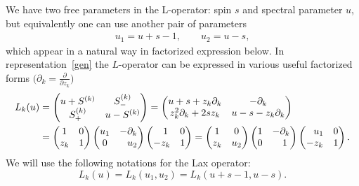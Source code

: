 \documentclass[pdftex]{sigma}
\numberwithin{equation}{section}
\begin{document}
We have two free parameters in the L-operator:
spin $s$ and spectral parameter $u$, but equivalently
one can use another pair of parameters
\begin{align*}
u_1 = u+s-1,\qquad u_2 = u - s,
\end{align*}
which appear in a natural way in factorized expression below.
In representation~\eqref{gen} the $L$-operator can be
expressed in various useful factorized forms
$\bigl(\partial_k = \frac{\partial}{\partial z_k}\bigr)$
\begin{align}
\nonumber
L_k(u) & =
\begin{pmatrix}
u + S^{(k)} & S_{-}^{(k)} \\
S_{+}^{(k)} & u - S^{(k)} \end{pmatrix} =
\begin{pmatrix} u+s+z_k \partial_k & -\partial_k\\
z_k^2 \partial_k + 2s z_k & u-s-z_k
\partial_k
\end{pmatrix}
\\
\label{Lfac}
&=
\begin{pmatrix}
 1 & 0 \\
 z_k & 1 \\
\end{pmatrix}
\begin{pmatrix}
 u_1 & -\partial_{k} \\
 0 & \hphantom{-} u_2 \\
\end{pmatrix}
\begin{pmatrix}
 \hphantom{-}1 & 0 \\
 -z_k & 1 \\
\end{pmatrix} =
\begin{pmatrix}
 1 & 0 \\
 z_k & u_2 \\
\end{pmatrix}
\begin{pmatrix}
 1 & -\partial_{k} \\
 0 & \hphantom{-}1 \\
\end{pmatrix}
\begin{pmatrix}
 \hphantom{-}u_1 & 0 \\
 -z_k & 1 \\
\end{pmatrix}.
\end{align}
We will use the following notations for
the Lax operator:
\begin{equation*}
L_k(u) = L_k(u_1 ,u_2) =
L_k(u+s-1 ,u - s) .
\end{equation*}
\end{document}
